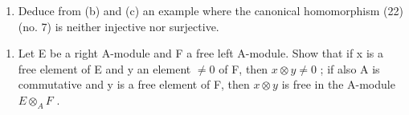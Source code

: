 \begin{enumerate}
\def\labelenumi{(\alph{enumi})}
\setcounter{enumi}{3}
\tightlist
\item
  Deduce from (b) and (c) an example where the canonical homomorphism (22) (no. 7) is neither injective nor surjective.
\end{enumerate}

\begin{enumerate}
\def\labelenumi{\arabic{enumi}.}
\setcounter{enumi}{3}
\tightlist
\item
  Let E be a right A-module and F a free left A-module. Show that if x is a free element of E and y an element \(\neq0\) of F, then \(x\otimes y\neq0\) ; if also A is commutative and y is a free element of F, then \(x\otimes y\) is free in the A-module \(E\otimes_{A}F\) .
\end{enumerate}

